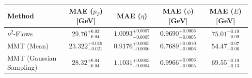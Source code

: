     \begin{tabular}{lcccc}
        \toprule
        Method & MAE ($p_T$) [GeV] & MAE ($\eta$) & MAE ($\phi$) [GeV] & MAE ($E$) [GeV] \\
        \midrule
        $\nu^2$-Flows & $29.76^{+0.03}_{-0.04}$ & $1.0093^{+0.0007}_{-0.0005}$ & $0.9690^{+0.0006}_{-0.0005}$ & $75.01^{+0.10}_{-0.09}$ \\
        MMT (Mean) & $23.322^{+0.019}_{-0.021}$ & $0.9176^{+0.0005}_{-0.0006}$ & $0.7689^{+0.0010}_{-0.0006}$ & $54.47^{+0.07}_{-0.06}$ \\
        MMT (Gaussian Sampling) & $28.32^{+0.04}_{-0.04}$ & $1.1031^{+0.0003}_{-0.0004}$ & $0.9966^{+0.0006}_{-0.0005}$ & $69.55^{+0.10}_{-0.13}$ \\
        \bottomrule
    \end{tabular}